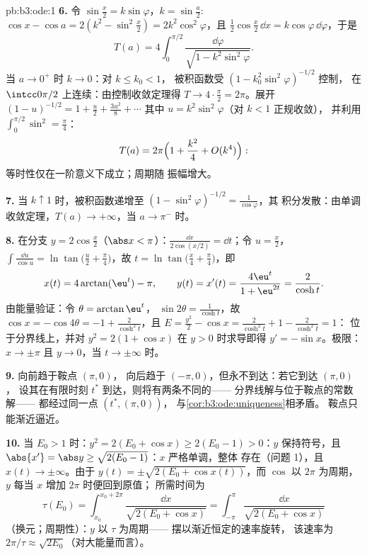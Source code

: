 \begin{solution}{pb:b3:ode:1}
\textbf{6.} 令 $\sin\frac x2 = k\sin\varphi$，$k =
\sin\frac a2$: $\cos x - \cos a = 2(k^2 - \sin^2\frac x2)
= 2k^2\cos^2\varphi$，且 $\frac12\cos\frac x2\,\dd x =
k\cos\varphi\,\dd\varphi$，于是
\[
T(a) = 4\int_0^{\pi/2}
\frac{\dd\varphi}{\sqrt{1 - k^2\sin^2\varphi}} .
\]
当 $a \to 0^+$ 时 $k \to 0$：对 $k \leq k_0 < 1$，
被积函数受 $(1 - k_0^2\sin^2\varphi)^{-1/2}$ 控制，
在 $\intcc0{\pi/2}$ 上连续：由控制收敛定理得 $T \to
4\cdot\frac\pi2 = 2\pi$。展开 $(1 - u)^{-1/2} = 1 +
\frac u2 + \frac{3u^2}8 + \cdots$ 其中 $u =
k^2\sin^2\varphi$（对 $k < 1$ 正规收敛），
并利用 $\int_0^{\pi/2}\sin^2 = \frac\pi4$：
\[
T(a) = 2\pi\Bigl(1 + \frac{k^2}{4} + O(k^4)\Bigr) :
\]
等时性仅在一阶意义下成立；周期随
振幅增大。

\textbf{7.} 当 $k \uparrow 1$ 时，被积函数递增至 $(1
- \sin^2\varphi)^{-1/2} = \frac1{\cos\varphi}$，其
积分发散：由单调收敛定理，$T(a) \to
+\infty$，当 $a \to \pi^-$ 时。

\textbf{8.} 在分支 $y = 2\cos\frac x2$（$\abs x <
\pi$）：$\frac{\dd x}{2\cos(x/2)} = \dd t$；令 $u = \frac
x2$，$\int\frac{\dd u}{\cos u} =
\ln\tan\bigl(\frac u2 + \frac\pi4\bigr)$，故 $t =
\ln\tan\bigl(\frac x4 + \frac\pi4\bigr)$，即
\[
x(t) = 4\arctan(\eu^t) - \pi,
\qquad y(t) = x'(t) = \frac{4\eu^t}{1 + \eu^{2t}} =
\frac{2}{\cosh t} .
\]
由能量验证：令 $\theta = \arctan\eu^t$，
$\sin2\theta = \frac1{\cosh t}$，故 $\cos x = -\cos4\theta =
-1 + \frac{2}{\cosh^2t}$，且 $E = \frac{y^2}2 - \cos x =
\frac2{\cosh^2t} + 1 - \frac2{\cosh^2t} = 1$：
位于分界线上，并对 $y^2 = 2(1 +
\cos x)$ 在 $y > 0$ 时求导即得 $y' = -\sin x$。极限：$x
\to \pm\pi$ 且 $y \to 0$，当 $t \to \pm\infty$ 时。

\textbf{9.} 向前趋于鞍点 $(\pi, 0)$，
向后趋于 $(-\pi, 0)$，但永不到达：若它到达 $(\pi, 0)$，
设其在有限时刻 $t^*$ 到达，则将有两条不同的——
分界线解与位于鞍点的常数解——
都经过同一点
$(t^*, (\pi, 0))$，
与\cref{cor:b3:ode:uniqueness}相矛盾。
鞍点只能渐近逼近。

\textbf{10.} 当 $E_0 > 1$ 时：$y^2 = 2(E_0 + \cos x) \geq
2(E_0 - 1) > 0$：$y$ 保持符号，且 $\abs{x'} = \abs y
\geq \sqrt{2(E_0 - 1)}$：$x$ 严格单调，整体
存在（问题 1），且 $x(t) \to \pm\infty$。由于 $y(t) =
\pm\sqrt{2(E_0 + \cos x(t))}$，而 $\cos$ 以 $2\pi$ 为周期，
$y$ 每当 $x$ 增加 $2\pi$ 时便回到原值；
所需时间为
\[
\tau(E_0) = \int_{x_0}^{x_0 + 2\pi}\frac{\dd
x}{\sqrt{2(E_0 + \cos x)}} =
\int_{-\pi}^{\pi}\frac{\dd x}{\sqrt{2(E_0 + \cos x)}}
\]
（换元；周期性）：$y$ 以 $\tau$ 为周期——
摆以渐近恒定的速率旋转，
该速率为 $2\pi/\tau \approx \sqrt{2E_0}$（对大能量而言）。


\end{solution}
